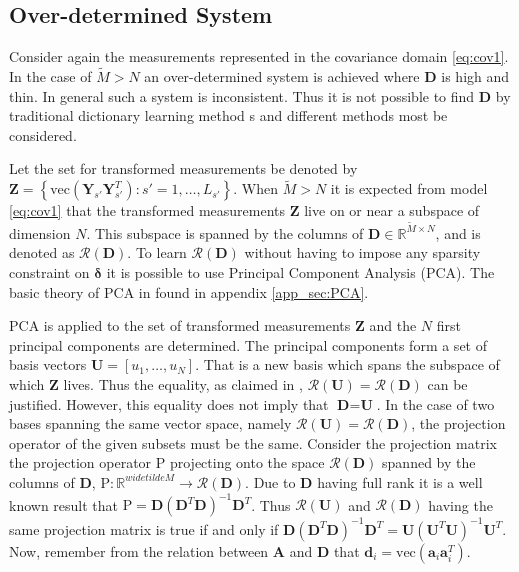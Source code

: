 \subsection{Over-determined System}\label{sec:over_det}
Consider again the measurements represented in the covariance domain \eqref{eq:cov1}.
In the case of $\widetilde{M} > N$ an over-determined system is achieved where $\textbf{D}$ is high and thin. In general such a system is inconsistent. Thus it is not possible to find $\textbf{D}$ by traditional dictionary learning method	s and different methods most be considered.

Let the set for transformed measurements be denoted by $\textbf{Z} = \left\{\text{vec}\left( \mathbf{Y}_{s'} \mathbf{Y}_{s'}^T \right) : s' = 1, \hdots, L_{s'} \right\}$. 
When $ \widetilde{M} > N $ it is expected from model \eqref{eq:cov1} that the transformed measurements $\textbf{Z}$ live on or near a subspace of dimension $N$. 
This subspace is spanned by the columns of $\textbf{D}\in\mathbb{R}^{\widetilde{M}\times N}$, and is denoted as $\mathcal{R}(\textbf{D})$. 
To learn $\mathcal{R}(\textbf{D})$ without having to impose any sparsity constraint on $\boldsymbol{\delta}$ it is possible to use Principal Component Analysis (PCA). The basic theory of PCA in found in appendix \ref{app_sec:PCA}. 

PCA is applied to the set of transformed measurements $\textbf{Z}$ and the $N$ first principal components are determined. The principal components form a set of basis vectors $\textbf{U}=[u_1,\hdots, u_N]$. That is a new basis which spans the subspace of which $\textbf{Z}$ lives. Thus the equality, as claimed in \cite{Balkan2015}, $\mathcal{R}(\textbf{U})=\mathcal{R}(\textbf{D})$ can be justified.  
However, this equality does not imply that $\textbf{D}=\textbf{U}$. 
In the case of two bases spanning the same vector space, namely $\mathcal{R}(\textbf{U})=\mathcal{R}(\textbf{D})$, the projection operator of the given subsets must be the same. 
Consider the projection matrix the projection operator $\text{P}$ projecting onto the space $\mathcal{R}(\textbf{D})$ spanned by the columns of $\textbf{D}$, $\text{P}:\mathbb{R}^{widetilde{M}}\rightarrow \mathcal{R}(\textbf{D})$. Due to $\textbf{D}$ having full rank it is a well known result that $\text{P} = \textbf{D}(\textbf{D}^T\textbf{D})^{-1}\textbf{D}^T$. 
Thus $\mathcal{R}(\textbf{U})$ and $\mathcal{R}(\textbf{D})$ having the same projection matrix is true if and only if $\textbf{D}(\textbf{D}^T\textbf{D})^{-1}\textbf{D}^T=\textbf{U}(\textbf{U}^T\textbf{U})^{-1}\textbf{U}^T$. 
Now, remember from the relation between $\textbf{A}$ and $\textbf{D}$ that $\textbf{d}_i = \text{vec}(\textbf{a}_i\textbf{a}_i^T)$. 

